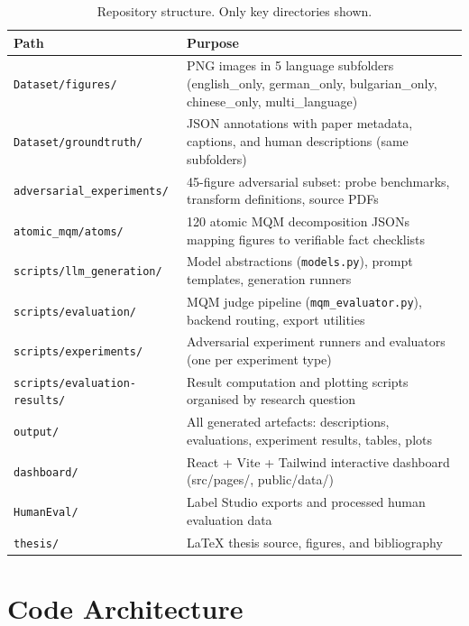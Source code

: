 \begin{table}[H]
\centering
\scriptsize
\caption{Repository structure. Only key directories shown.}\label{tab:repo-structure}
\begin{tabular}{@{}l p{8.5cm}@{}}
\toprule
\textbf{Path} & \textbf{Purpose} \\
\midrule
\texttt{Dataset/figures/}           & PNG images in 5 language subfolders (english\_only, german\_only, bulgarian\_only, chinese\_only, multi\_language) \\
\texttt{Dataset/groundtruth/}       & JSON annotations with paper metadata, captions, and human descriptions (same subfolders) \\
\texttt{adversarial\_experiments/}   & 45-figure adversarial subset: probe benchmarks, transform definitions, source PDFs \\
\texttt{atomic\_mqm/atoms/}          & 120 atomic MQM decomposition JSONs mapping figures to verifiable fact checklists \\
\texttt{scripts/llm\_generation/}    & Model abstractions (\texttt{models.py}), prompt templates, generation runners \\
\texttt{scripts/evaluation/}         & MQM judge pipeline (\texttt{mqm\_evaluator.py}), backend routing, export utilities \\
\texttt{scripts/experiments/}        & Adversarial experiment runners and evaluators (one per experiment type) \\
\texttt{scripts/evaluation-results/} & Result computation and plotting scripts organised by research question \\
\texttt{output/}                     & All generated artefacts: descriptions, evaluations, experiment results, tables, plots \\
\texttt{dashboard/}                  & React + Vite + Tailwind interactive dashboard (src/pages/, public/data/) \\
\texttt{HumanEval/}                  & Label Studio exports and processed human evaluation data \\
\texttt{thesis/}                     & LaTeX thesis source, figures, and bibliography \\
\bottomrule
\end{tabular}
\end{table}

\section{Code Architecture}

